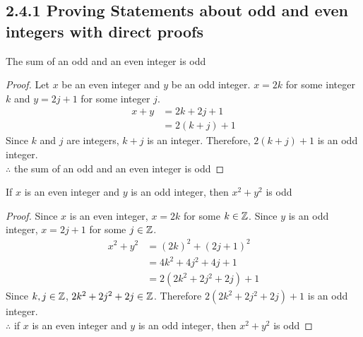 





\subsection*{2.4.1 Proving Statements about odd and even integers with direct proofs}
\begin{enumerate}
   The sum of an odd and an even integer is odd
  \begin{proof}
    Let $x$ be an even integer and $y$ be an odd integer. $x=2k$ for some integer $k$ and $y=2j+1$ for some integer $j$.
    \begin{align*}
      x + y & = 2k + 2j +1 \\
            & = 2(k+j)+1
    \end{align*}
    Since $k$ and $j$ are integers, $k+j$ is an integer. Therefore, $2(k+j)+1$ is an odd integer. \\
    $\therefore$ the sum of an odd and an even integer is odd
  \end{proof}
   If $x$ is an even integer and $y$ is an odd integer, then $x^2+y^2$ is odd
  \begin{proof}
    Since $x$ is an even integer, $x = 2k$ for some $k \in \mathbb{Z}$.
    Since $y$ is an odd integer, $x = 2j + 1$ for some $j \in \mathbb{Z}$.
    \begin{align*}
      x^2+y^2 & = (2k)^2 + (2j+1)^2       \\
              & = 4k^2 + 4j^2 + 4j + 1    \\
              & = 2(2k^2 + 2j^2 + 2j) + 1
    \end{align*}
    Since $k,j \in \mathbb{Z}$, $2k^2 + 2j^2 + 2j \in \mathbb{Z}$. Therefore $2(2k^2 + 2j^2 + 2j) + 1$ is an odd integer. \\
    $\therefore$ if $x$ is an even integer and $y$ is an odd integer, then $x^2+y^2$ is odd
  \end{proof}
\end{enumerate}

